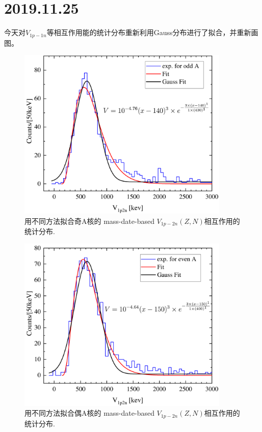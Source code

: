 \section{2019.11.25}
今天对$V_{1p-1n}$等相互作用能的统计分布重新利用Gauss分布进行了拟合，并重新画图。
\begin{figure}[H]
\centering
\includegraphics[width=0.9\textwidth]{figure/V1p2noAGau.pdf}
\caption{用不同方法拟合奇A核的 mass-date-based $V_{1p-2n}(Z,N)$相互作用的统计分布.\label{fig_V1p2noAGau}}
\end{figure}
\begin{figure}[H]
\centering
\includegraphics[width=0.9\textwidth]{figure/V1p2neAGau.pdf}
\caption{用不同方法拟合偶A核的 mass-date-based $V_{1p-2n}(Z,N)$相互作用的统计分布.\label{fig_V1p2neAGau}}
\end{figure}


